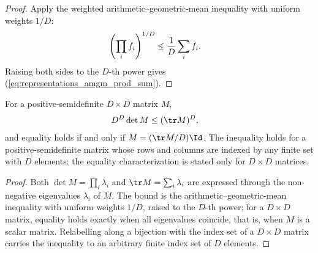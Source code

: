 \begin{proof}\leanok
    Apply the weighted arithmetic--geometric-mean inequality with uniform
    weights $1/D$:
    \begin{align}
        \left(\prod_{i}f_{i}\right)^{1/D}
        &\leq\frac{1}{D}\sum_{i}f_{i}.
        \notag
    \end{align}
    Raising both sides to the $D$-th power gives
    (\ref{eq:representations_amgm_prod_sum}).
\end{proof}

\begin{lemma}
\label{lem:trace_det_amgm}
    \leanok
    For a positive-semidefinite $D \times D$ matrix $M$,
    \begin{align}
        D^{D}\det M
        &\leq(\tr M)^{D},
        \label{eq:representations_trace_det_amgm}
    \end{align}
    and equality holds if and only if $M=(\tr M/D)\Id$. The inequality holds
    for a positive-semidefinite matrix whose rows and columns are indexed by
    any finite set with $D$ elements; the equality characterization is stated
    only for $D \times D$ matrices.
\end{lemma}

\begin{proof}\leanok
    Both $\det M=\prod_{i}\lambda_{i}$ and
    $\tr M=\sum_{i}\lambda_{i}$ are expressed through the non-negative
    eigenvalues $\lambda_i$ of $M$. The bound is the
    arithmetic--geometric-mean inequality with uniform weights $1/D$, raised
    to the $D$-th power; for a $D \times D$ matrix, equality holds exactly
    when all eigenvalues coincide, that is, when $M$ is a scalar matrix.
    Relabelling along a bijection with the index set of a $D \times D$ matrix
    carries the inequality to an arbitrary finite index set of $D$ elements.
\end{proof}

